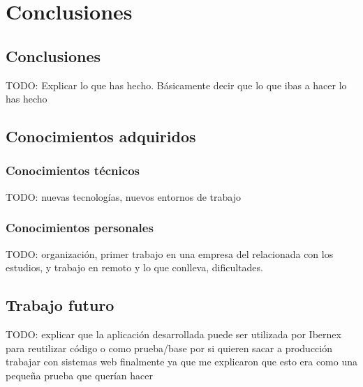 \chapter{Conclusiones}

\section{Conclusiones}

TODO: Explicar lo que has hecho. Básicamente decir que lo que ibas a hacer lo has hecho

\section{Conocimientos adquiridos}

\subsection{Conocimientos técnicos}

TODO: nuevas tecnologías, nuevos entornos de trabajo

\subsection{Conocimientos personales}

TODO:  organización, primer trabajo en una empresa del relacionada con los estudios, y trabajo en remoto y lo que conlleva, dificultades.

\section{Trabajo futuro}

TODO: explicar que la aplicación desarrollada puede ser utilizada por Ibernex para reutilizar código o como prueba/base por si quieren sacar a producción trabajar con sistemas web finalmente ya que me explicaron que esto era como una pequeña prueba que querían hacer